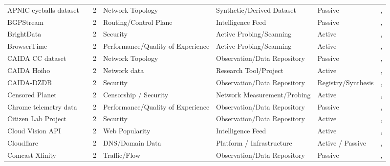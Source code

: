 \documentclass[11pt,a4paper]{article}
\begin{document}
\begin{longtable}{@{}p{}p{}p{}p{}p{}p{}p{}@{}}
APNIC eyeballs dataset & \cite{apnic_eyeballs} & 2 & Network Topology & Synthetic/Derived Dataset & Passive & \cite{10.1145/3487552.3487822}, \cite{10.1145/3777912.3839831} \\
BGPStream & \cite{bgpstream} & 2 & Routing/Control Plane & Intelligence Feed & Passive & \cite{10.1007/978-3-030-98785-5_20}, \cite{10.1145/3777912.3809145} \\
BrightData & \cite{brightdata} & 2 & Security & Active Probing/Scanning & Active & \cite{10.1145/3487552.3487849}, \cite{10.1007/978-3-031-85960-1_15} \\
BrowserTime & \cite{browsertime} & 2 & Performance/Quality of Experience & Active Probing/Scanning & Active & \cite{10.1145/3517745.3561416}, \cite{10.1007/978-3-031-28486-1_1} \\
CAIDA CC dataset & \cite{caida-cc-dataset} & 2 & Network Topology & Observation/Data Repository & Passive & \cite{10.1145/3618257.3624812}, \cite{10.1145/3487552.3487825} \\
CAIDA Hoiho & \cite{hoiho} & 2 & Network data & Research Tool/Project & Active & \cite{10.1145/3777912.3839791}, \cite{10.1145/3777912.3839795} \\
CAIDA-DZDB & \cite{caida-dzdb} & 2 & Security & Observation/Data Repository & Registry/Synthesis & \cite{10.1145/3517745.3561425}, \cite{10.1145/3487552.3487816} \\
Censored Planet & \cite{10.1145/3372297.3417883} & 2 & Censorship / Security & Network Measurement/Probing & Active & \cite{10.1007/978-3-030-98785-5_23}, \cite{10.1007/978-3-030-98785-5_28} \\
Chrome telemetry data & \cite{chrome-telemetry} & 2 & Performance/Quality of Experience & Observation/Data Repository & Passive & \cite{10.1145/3517745.3561418}, \cite{10.1145/3517745.3561444} \\
Citizen Lab Project & \cite{citizen-lab} & 2 & Security & Observation/Data Repository & Active & \cite{10.1145/3618257.3624817}, \cite{10.1145/3487552.3487836} \\
Cloud Vision API & \cite{google_cloud_vision} & 2 & Web Popularity & Intelligence Feed & Active & \cite{10.1145/3517745.3561460}, \cite{10.1145/3487552.3487850} \\
Cloudflare & \cite{cloudflare} & 2 & DNS/Domain Data & Platform / Infrastructure & Active / Passive & \cite{10.1145/3777912.3839811}, \cite{10.1145/3777912.3839791} \\
Comcast Xfinity & \cite{comcast-xfinity} & 2 & Traffic/Flow & Observation/Data Repository & Passive & \cite{10.1145/3487552.3487862}, \cite{10.1007/978-3-030-98785-5_4} \\

\end{longtable}
\end{document}
